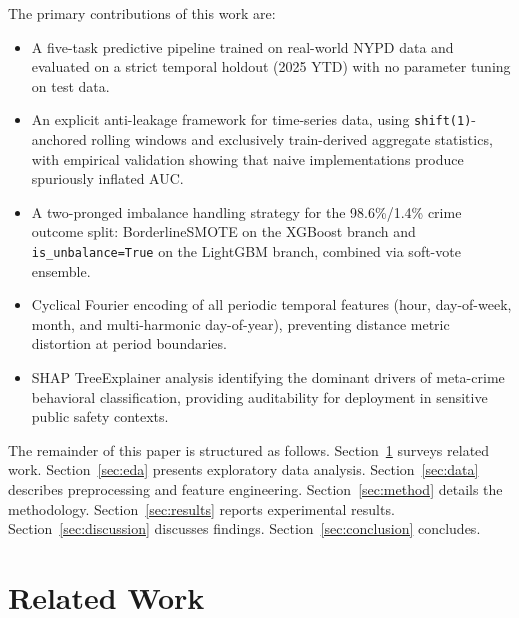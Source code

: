 \documentclass[conference]{IEEEtran}
\begin{document}
The primary contributions of this work are:
\begin{itemize}
  \item A five-task predictive pipeline trained on real-world NYPD data and evaluated on a strict temporal holdout (2025 YTD) with no parameter tuning on test data.
  \item An explicit anti-leakage framework for time-series data, using \texttt{shift(1)}-anchored rolling windows and exclusively train-derived aggregate statistics, with empirical validation showing that naive implementations produce spuriously inflated AUC.
  \item A two-pronged imbalance handling strategy for the 98.6\%/1.4\% crime outcome split: BorderlineSMOTE on the XGBoost branch and \texttt{is\_unbalance=True} on the LightGBM branch, combined via soft-vote ensemble.
  \item Cyclical Fourier encoding of all periodic temporal features (hour, day-of-week, month, and multi-harmonic day-of-year), preventing distance metric distortion at period boundaries.
  \item SHAP TreeExplainer analysis identifying the dominant drivers of meta-crime behavioral classification, providing auditability for deployment in sensitive public safety contexts.
\end{itemize}

The remainder of this paper is structured as follows. Section~\ref{sec:related} surveys related work. Section~\ref{sec:eda} presents exploratory data analysis. Section~\ref{sec:data} describes preprocessing and feature engineering. Section~\ref{sec:method} details the methodology. Section~\ref{sec:results} reports experimental results. Section~\ref{sec:discussion} discusses findings. Section~\ref{sec:conclusion} concludes.

\section{Related Work}
\label{sec:related}
\end{document}
